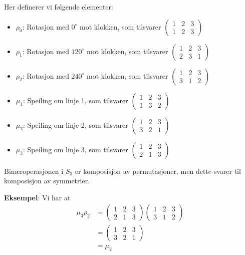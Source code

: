 Her definerer vi følgende elementer:
\begin{itemize}
	\item $\rho_0$: Rotasjon med $0^\circ$ mot klokken, som tilsvarer
	      $\begin{pmatrix}1 & 2 & 3 \\ 1 & 2 & 3\end{pmatrix}$
	\item $\rho_1$: Rotasjon med $120^\circ$ mot klokken, som tilsvarer
	      $\begin{pmatrix}1 & 2 & 3 \\ 2 & 3 & 1\end{pmatrix}$
	\item $\rho_2$: Rotasjon med $240^\circ$ mot klokken, som tilsvarer
	      $\begin{pmatrix}1 & 2 & 3 \\ 3 & 1 & 2\end{pmatrix}$
	\item $\mu_1$: Speiling om linje 1, som tilsvarer
	      $\begin{pmatrix}1 & 2 & 3 \\ 1 & 3 & 2\end{pmatrix}$
	\item $\mu_2$: Speiling om linje 2, som tilsvarer
	      $\begin{pmatrix}1 & 2 & 3 \\ 3 & 2 & 1\end{pmatrix}$
	\item $\mu_3$: Speiling om linje 3, som tilsvarer
	      $\begin{pmatrix}1 & 2 & 3 \\ 2 & 1 & 3\end{pmatrix}$
\end{itemize}

Binæroperasjonen i $S_3$ er komposisjon av permutasjoner, men dette svarer til komposisjon av
symmetrier.

\textbf{Eksempel}:
Vi har at
\begin{align}
	\mu_3\rho_2 & =\begin{pmatrix}1 & 2 & 3 \\ 2 & 1 & 3\end{pmatrix}
	\begin{pmatrix}1 & 2 & 3 \\ 3 & 1 & 2\end{pmatrix}                 \\
	            & = \begin{pmatrix}1 & 2 & 3 \\ 3 & 2 & 1\end{pmatrix} \\
	            & = \mu_2
\end{align}

